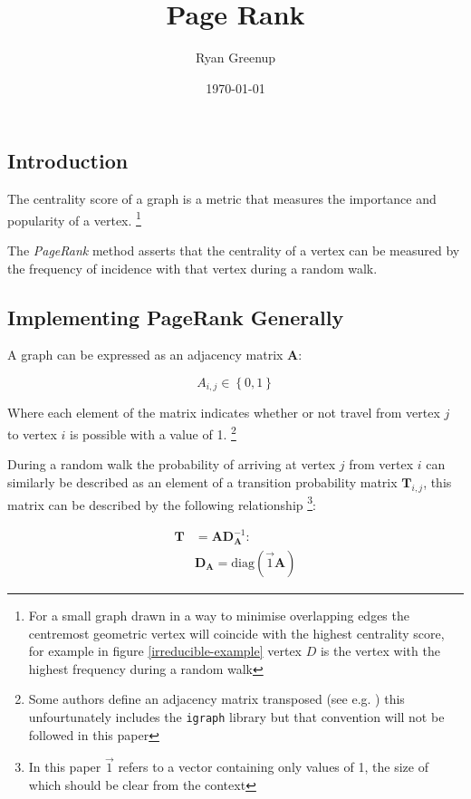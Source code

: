 \documentclass[11pt]{article}
\author{Ryan Greenup}
\date{\today}
\title{Page Rank}
\begin{document}
\maketitle
\tableofcontents


\subsection{Introduction}
\label{sec:org140cc19}
The centrality score of a graph is a metric that measures the
importance and popularity of a vertex. \footnote{For a small graph drawn
in a way to minimise overlapping edges the centremost geometric vertex
will coincide with the highest centrality score, for example in figure
\ref{irreducible-example} vertex \(D\) is the vertex with the highest
frequency during a random walk}


The \emph{PageRank} method asserts that the centrality of a vertex can be
measured by the frequency of incidence with that vertex during a
random walk.

\subsection{Implementing PageRank Generally}
\label{PageRank-Generally}
A graph can be expressed as an adjacency matrix \(\mathbf{A}\):

\[
A_{i,j} \in \left\{ 0,1 \right\}
\]

Where each element of the matrix indicates whether or not travel from
vertex \(j\) to vertex \(i\) is possible with a value of 1. \footnote{Some
authors define an adjacency matrix transposed (see e.g.
\cite{rosenDiscreteMathematicsIts2007,AdjacencyMatrix2020a,meghabghabSearchEnginesLink2008})
this unfourtunately includes the \texttt{igraph} library
\cite{gaborcsardiIgraphManualPages2019} but that convention will not be
followed in this paper}

During a random walk the probability of arriving at vertex \(j\) from vertex
\(i\) can similarly be described as an element of a transition probability
matrix \(\mathbf{T}_{i,j}\), this matrix can be described by the following
relationship \footnote{In this paper \(\vec{1}\) refers to a vector containing only
values of 1, the size of which should be clear from the context}:

\begin{align}
\mathbf{T} &= \mathbf{A} \mathbf{D}^{-1}_{\mathbf{A}} \label{eq:basic-trans-def} : \\
& \mathbf{D}_{\mathbf{A}} = \mathrm{diag}\left(\vec{1} \mathbf{A}\right) \label{eq:diagScaleDef}
\end{align}
\end{document}
